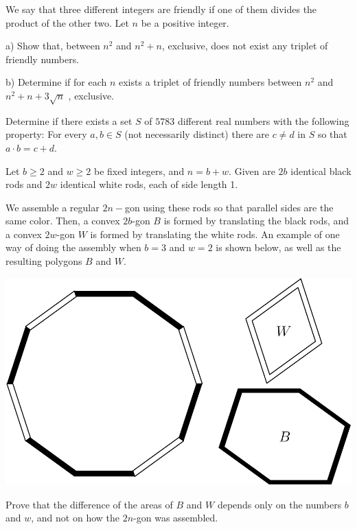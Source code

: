 \documentclass[11pt]{scrartcl}
\begin{document}
\begin{problem}
We say that three different integers are friendly if one of them divides the product of the other two. Let $n$ be a positive integer.

a) Show that, between $n^2$ and $n^2+n$, exclusive, does not exist any triplet of friendly numbers.

b) Determine if for each $n$ exists a triplet of friendly numbers between $n^2$ and $n^2+n+3\sqrt{n}$ , exclusive.
\end{problem}
\begin{problem}[Israel 2023/6]
Determine if there exists a set $S$ of $5783$ different real numbers with the following property:
For every $a,b\in S$ (not necessarily distinct) there are $c\neq d$ in $S$ so that $a\cdot b=c+d$.
\end{problem}
\begin{problem}[USAMO 2022/2]
    	Let $b\geq2$ and $w\geq2$ be fixed integers, and $n=b+w$. Given are $2b$ identical black rods and $2w$ identical white rods, each of side length 1.

We assemble a regular $2n-$gon using these rods so that parallel sides are the same color. Then, a convex $2b$-gon $B$ is formed by translating the black rods, and a convex $2w$-gon $W$ is formed by translating the white rods. An example of one way of doing the assembly when $b=3$ and $w=2$ is shown below, as well as the resulting polygons $B$ and $W$.

\begin{center}
\includegraphics[scale=0.5]{USAMO2022_2.png}
\end{center}
Prove that the difference of the areas of $B$ and $W$ depends only on the numbers $b$ and $w$, and not on how the $2n$-gon was assembled.
\end{problem}
\end{document}
